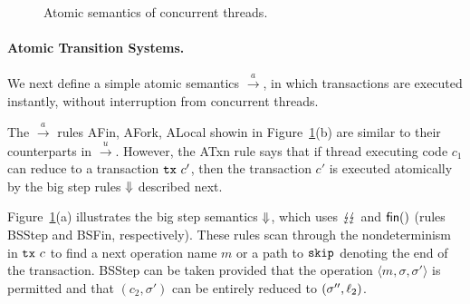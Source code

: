 \begin{figure}
\caption{\label{fig:atomic} Atomic semantics of concurrent threads.}
\end{figure}


\paragraph{Atomic Transition Systems.}
We next define a simple atomic semantics $\xrightarrow{a}$,
in which transactions are executed instantly, without interruption
from concurrent threads.

The $\xrightarrow{a}$ rules {\sc AFin, AFork, ALocal} showin in 
Figure~\ref{fig:atomic}(b) are similar to
their counterparts in $\xrightarrow{u}$.
%
However, the {\sc ATxn} rule says that if thread executing code $c_1$ can reduce to a 
transaction $\texttt{tx}\ c'$, then the transaction $c'$ is executed
atomically by the big step rules $\Downarrow$ described next.

Figure~\ref{fig:atomic}(a) illustrates the
big step semantics $\Downarrow$, which uses $\lightning\!\lightning$ and $\textsf{fin}()$ 
(rules {\sc BSStep} and {\sc BSFin}, respectively). These rules
scan through the nondeterminism in $\texttt{tx}\ c$ to find a next operation
name $m$ or a path to $\texttt{skip}$ denoting the end of the transaction.
%
{\sc BSStep} can be taken provided that the operation $\langle m,\sigma,\sigma'\rangle$ is
permitted and that $(c_2,\sigma')$ can be
entirely reduced to $(\sigma'',\ell_2)$.




